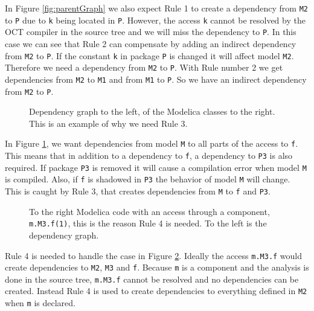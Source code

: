 \documentclass{cslthse-msc}
\begin{document}
In Figure \ref{fig:parentGraph} we also expect Rule 1 to create a dependency from \texttt{M2} to \texttt{P} due to \texttt{k} being located in \texttt{P}. However, the access \texttt{k} cannot be resolved by the OCT compiler in the source tree and we will miss the dependency to \texttt{P}. In this case we can see that Rule 2 can compensate by adding an indirect dependency from \texttt{M2} to \texttt{P}. 
If the constant \texttt{k} in package \texttt{P} is changed it will affect model \texttt{M2}. Therefore we need a dependency from \texttt{M2} to \texttt{P}. With Rule number 2 we get dependencies from \texttt{M2} to \texttt{M1} and from \texttt{M1} to \texttt{P}. So we have an indirect dependency from \texttt{M2} to \texttt{P}.

\begin{figure}[!htbp]
    \centering
    \qquad
    \caption{Dependency graph to the left, of the Modelica classes to the right. This is an example of why we need Rule 3.}
    \label{fig:dotAccess}
\end{figure}

In Figure \ref{fig:dotAccess}, we want dependencies from model \texttt{M} to all parts of the access to \texttt{f}. This means that in addition to a dependency to \texttt{f}, a dependency to \texttt{P3} is also required. If package \texttt{P3} is removed it will cause a compilation error when model \texttt{M} is compiled. Also, if \texttt{f} is shadowed in \texttt{P3} the behavior of model \texttt{M} will change. This is caught by Rule 3, that creates dependencies from \texttt{M} to \texttt{f} and \texttt{P3}.


\begin{figure}[!htbp]
    \centering
    \qquad
    \subfloat{\raisebox{4.7 cm}{}}
    \caption{To the right Modelica code with an access through a component, \texttt{m.M3.f(1)}, this is the reason Rule 4 is needed. To the left is the dependency graph.}
    \label{fig:component}
\end{figure}

Rule 4 is needed to handle the case in Figure \ref{fig:component}. Ideally the access \texttt{m.M3.f} would create dependencies to \texttt{M2}, \texttt{M3} and \texttt{f}. Because \texttt{m} is a component and the analysis is done in the source tree, \texttt{m.M3.f} cannot be resolved and no dependencies can be created. Instead Rule 4 is used to create dependencies to everything defined in \texttt{M2} when \texttt{m} is declared.
\end{document}
